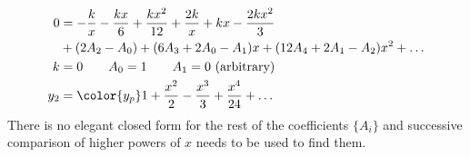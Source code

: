 \begin{enumerate}
\begin{align}
              0   & = -\frac{k}{x} - \frac{kx}{6} + \frac{kx^2}{12} + \frac{2k}{x}
              + kx - \frac{2kx^2}{3}                                                \\
                  & + (2A_2 - A_0) + (6A_3 + 2A_0 - A_1)x + (12A_4 + 2A_1 - A_2)x^2
              + \dots                                                               \\
              k   & = 0 \qquad A_0 = 1 \qquad A_1 = 0\ \text{(arbitrary)}           \\
              y_2 & = {\color{y_p} 1 + \frac{x^2}{2} - \frac{x^3}{3}
              + \frac{x^4}{24} + \dots  }
          \end{align}
          There is no elegant closed form for the rest of the coefficients $ \{A_i\} $ and
          successive comparison of higher powers of $ x $ needs to be used to find them.


\end{enumerate}
